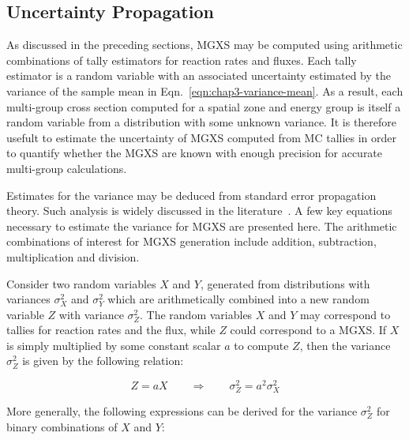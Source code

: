 \subsection{Uncertainty Propagation}
\label{subsec:chap3-uncertainty-prop}

As discussed in the preceding sections, \ac{MGXS} may be computed using arithmetic combinations of tally estimators for reaction rates and fluxes. Each tally estimator is a random variable with an associated uncertainty estimated by the variance of the sample mean in Eqn.~\ref{eqn:chap3-variance-mean}. As a result, each multi-group cross section computed for a spatial zone and energy group is itself a random variable from a distribution with some unknown variance. It is therefore usefult to estimate the uncertainty of \ac{MGXS} computed from \ac{MC} tallies in order to quantify whether the \ac{MGXS} are known with enough precision for accurate multi-group calculations. 

Estimates for the variance may be deduced from standard error propagation theory. Such analysis is widely discussed in the literature~\cite{bevington2003data}. A few key equations necessary to estimate the variance for \ac{MGXS} are presented here. The arithmetic combinations of interest for \ac{MGXS} generation include addition, subtraction, multiplication and division. 

Consider two random variables $X$ and $Y$, generated from distributions with variances $\sigma_{X}^2$ and $\sigma_{Y}^2$ which are arithmetically combined into a new random variable $Z$ with variance $\sigma_{Z}^2$. The random variables $X$ and $Y$ may correspond to tallies for reaction rates and the flux, while $Z$ could correspond to a \ac{MGXS}. If $X$ is simply multiplied by some constant scalar $a$ to compute $Z$, then the variance $\sigma_{Z}^{2}$ is given by the following relation:

\vspace{-0.1in}

\begin{equation}
\label{eqn:chap3-scalar-mult}
Z = aX \qquad\Rightarrow\qquad \sigma_{Z}^{2} = a^{2}\sigma_{X}^{2}
\end{equation}

\noindent More generally, the following expressions can be derived for the variance $\sigma_{Z}^{2}$ for binary combinations of $X$ and $Y$:

\vspace{-0.4in}


